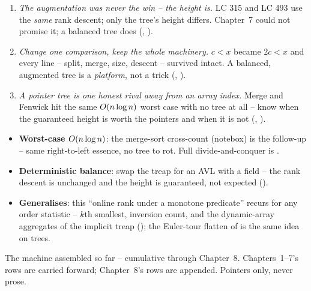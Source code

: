 \begin{insightbox}
\begin{enumerate}[nosep, leftmargin=1.6em]
  \item \emph{The augmentation was never the win -- the height is.} LC 315 and LC 493 use the \emph{same}
        rank descent; only the tree's height differs. Chapter~7 could not promise it; a balanced tree does
        (, ).
  \item \emph{Change one comparison, keep the whole machinery.} $c<x$ became $2c<x$ and every line -- split,
        merge, size, descent -- survived intact. A balanced, augmented tree is a \emph{platform}, not a
        trick (, ).
  \item \emph{A pointer tree is one honest rival away from an array index.} Merge and Fenwick hit the same
        $O(n\log n)$ worst case with no tree at all -- know when the guaranteed height is worth the
        pointers and when it is not (, ).
\end{enumerate}
\end{insightbox}

\begin{hardeningbox}
\begin{itemize}[nosep, leftmargin=1.4em]
  \item \textbf{Worst-case $O(n\log n)$}: the merge-sort cross-count (notebox) is the follow-up -- same
        right-to-left essence, no tree to rot. Full divide-and-conquer is .
  \item \textbf{Deterministic balance}: swap the treap for an AVL with a  field -- the rank
        descent is unchanged and the height is guaranteed, not expected ().
  \item \textbf{Generalises}: this ``online rank under a monotone predicate'' recurs for any order statistic
        -- $k$th smallest, inversion count, and the dynamic-array aggregates of the implicit treap
        (); the Euler-tour flatten of  is the same idea on trees.
\end{itemize}
\end{hardeningbox}


The machine assembled so far -- cumulative through Chapter~8. Chapters~1--7's rows are carried
forward; Chapter~8's rows are appended. Pointers only, never prose.


